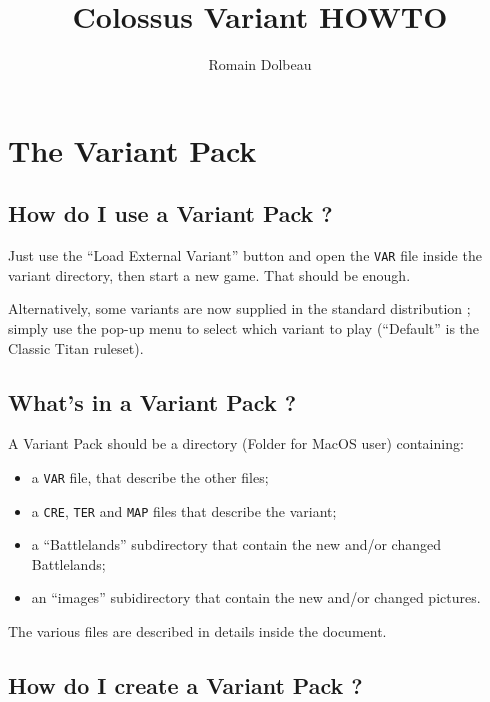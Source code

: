 \documentclass{article}
\begin{document}

\title{Colossus Variant HOWTO}

\author{Romain Dolbeau}

\maketitle

\section{The Variant Pack}

\subsection{How do I use a Variant Pack ?}

Just use the ``Load External Variant'' button and open the
\texttt{VAR} file inside the variant directory, then start a new
game. That should be enough.

Alternatively, some variants are now supplied in the
standard distribution ; simply use the pop-up menu
to select which variant to play (``Default'' is the
Classic Titan ruleset).

\subsection{What's in a Variant Pack ?}

A Variant Pack should be a directory (Folder for
MacOS user) containing:

\begin{itemize}
\item a \texttt{VAR} file, that describe the other files;
\item a \texttt{CRE}, \texttt{TER} and \texttt{MAP} files that describe the variant;
\item a ``Battlelands'' subdirectory that contain the new and/or changed Battlelands;
\item an ``images'' subidirectory that contain the new and/or changed pictures.
\end{itemize}

The various files are described in details inside the  document.

\subsection{How do I create a Variant Pack ?}
\end{document}
